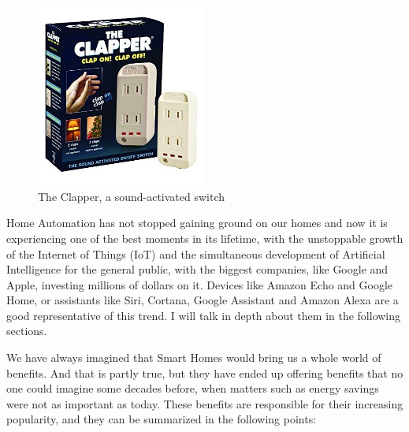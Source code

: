 \begin{figure}
	\centering
	\includegraphics[width=0.5\textwidth]{images/Chapter_02/the-clapper.jpg}
	\caption{The Clapper, a sound-activated switch}
	\label{fig:the-clapper}
\end{figure}

\bigskip
Home Automation has not stopped gaining ground on our homes and now it is experiencing one of the best moments
in its lifetime, with the unstoppable growth of the Internet of Things (IoT) and the simultaneous development of Artificial 
Intelligence for the general public, with the biggest companies, like Google and Apple, investing millions of dollars on it.
Devices like Amazon Echo and Google Home, or assistants like Siri, Cortana, Google Assistant and Amazon Alexa are a 
good representative of this trend. I will talk in depth about them in the following sections.

\bigskip
We have always imagined that Smart Homes would bring us a whole world of benefits. And that is partly true, but
they have ended up offering benefits that no one could imagine some decades before, when matters such as energy
savings were not as important as today. These benefits are responsible for their increasing popularity, and they can be 
summarized in the following points:

